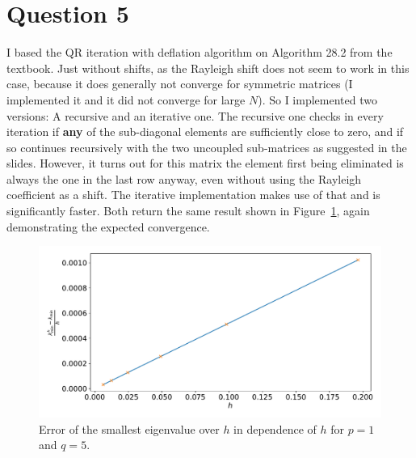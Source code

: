 \documentclass[a4paper, 11pt]{article}
\begin{document}
{\section*{Question 5}
I based the QR iteration with deflation algorithm on Algorithm 28.2 from the
textbook. Just without shifts, as the Rayleigh shift does not seem to work in
this case, because it does generally not converge for symmetric matrices (I
implemented it and it did not converge for large $N$). So I implemented two
versions: A recursive and an iterative one. The recursive one checks in every
iteration if \textbf{any} of the sub-diagonal elements are sufficiently close
to zero, and if so continues recursively with the two uncoupled sub-matrices as
suggested in the slides. However, it turns out for this matrix the element
first being eliminated is always the one in the last row anyway, even without
using the Rayleigh coefficient as a shift. The iterative implementation makes
use of that and is significantly faster. Both return the same result shown in
Figure~\ref{fig:5}, again demonstrating the expected convergence.
\begin{figure}
  \centering
  \includegraphics[width=\textwidth]{../code/5.pdf}
  \caption{Error of the smallest eigenvalue over $h$ in dependence of $h$ for
  $p = 1$ and $q = 5$.}
  \label{fig:5}
\end{figure}

\FloatBarrier
}
\end{document}
